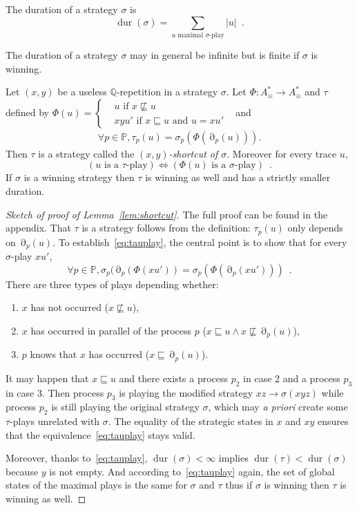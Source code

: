 \documentclass[a4paper,UKenglish]{lipics-v2016}
\newcommand{\PP}{\mathbb{P}}
\newcommand{\QQ}{\mathbb{Q}}
\newcommand{\pref}{\sqsubseteq}
\newcommand{\be}{\begin{equation}}
\newcommand{\ee}{\end{equation}}
\DeclareMathOperator{\view}{\partial}
\DeclareMathOperator{\dur}{dur}
\begin{document}
\begin{definition}
The duration of a strategy $\sigma$ is 
\[
\dur(\sigma)=  \sum_{\text{$u$ maximal $\sigma$-play}} |u|\enspace.
\]
\end{definition}

The duration of a  strategy $\sigma$ may in general be infinite but is finite if $\sigma$ is winning.

\begin{lemma}
\label{lem:shortcut}
Let $(x,y)$ be a  useless $\QQ$-repetition in a  strategy $\sigma$.
Let $\Phi:A^*_\equiv \to A^*_\equiv$ and $\tau$ defined by
$\Phi(u)
=
\begin{cases}
&u \text{ if } x \not \pref u\\
&xyu' \text{ if } x \pref u \text{ and } u=xu'\enspace
\end{cases}$
and
\begin{align*}
\forall p \in \PP, \tau_p(u)
=
\sigma_p(\Phi(\view_p(u))).
\end{align*}
Then $\tau$ is a strategy
called the \emph{$(x,y)$-shortcut of $\sigma$}.
Moreover
for every trace $u$,
\be
\label{eq:tauplay}
(\text{$u$ is a $\tau$-play})
\iff 
(\text{$\Phi(u)$ is a $\sigma$-play})
\enspace.
\ee
If $\sigma$ is a winning strategy then $\tau$ is winning as well and has a strictly smaller duration.
\end{lemma}
\begin{proof}[Sketch of proof of Lemma~\ref{lem:shortcut}]
The full proof can be found in the appendix.
That $\tau$ is a strategy follows from the definition: $\tau_p(u)$ only depends on $\view_p(u)$. To establish~\eqref{eq:tauplay},
the central point is to show that for every $\sigma$-play $xu'$,
\begin{equation*}
\forall p \in\PP,
\sigma_p(\view_p(\Phi(xu'))
=
\sigma_p(\Phi(\view_p(xu')))\enspace.
\end{equation*}
There are three types of plays depending whether:
\begin{enumerate}
\item
$x$ has not occurred  ($x \not \pref u$),
\item
$x$ has occurred in parallel of the process $p$
($x \pref u \land x \not\pref\view_p(u)$),
\item
$p$ knows that
$x$ has occurred
($x \pref \view_p(u)$).
\end{enumerate}
It may happen that $x \pref u$ and
there exists a process $p_2$ in case 2 and a process $p_3$ in case 3. Then process $p_3$ is playing the modified strategy
$xz \to \sigma(xyz)$ while process $p_2$ is still playing the original strategy $\sigma$, which may \emph{a priori} create some $\tau$-plays unrelated with $\sigma$.
The equality of the strategic states in $x$ and $xy$ ensures that the equivalence~\eqref{eq:tauplay} stays valid.

Moreover, thanks to~\eqref{eq:tauplay},
$\dur(\sigma)<\infty$ implies $\dur(\tau)< \dur(\sigma)$ because $y$ is not empty.
And according to~\eqref{eq:tauplay} again,
the set of global states of the maximal plays is the same for $\sigma$ and $\tau$ thus if $\sigma$ is winning then $\tau$ is winning as well.
\end{proof}
\end{document}
